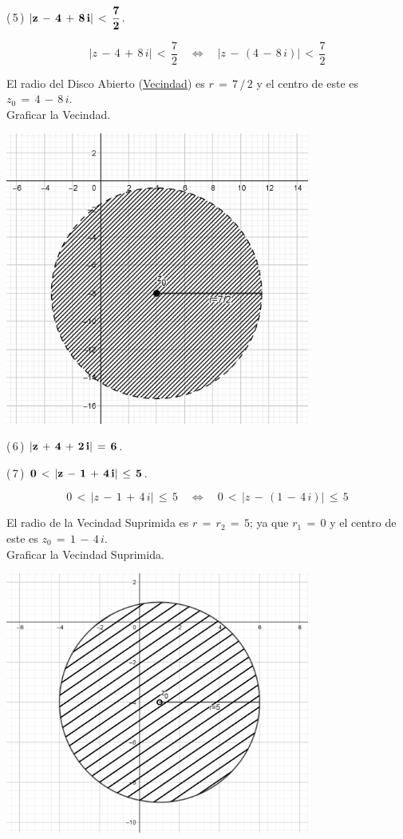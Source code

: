 \documentclass[a4paper,11pt,openany]{book}
\begin{document}
\textcolor{ao(english)}{(\,5\,)} $\bf{|z\,-\,4\,+\,8\,i|\,<\,\dfrac{7}{2}}$.

$$|z\,-\,4\,+\,8\,i|\,<\,\dfrac{7}{2} \quad\iff\quad |z\,-\,(4\,-\,8\,i)|\,<\,\dfrac{7}{2}$$

El radio del Disco Abierto (\underline{Vecindad}) es $r\,=\,7\,/\,2$ y el centro de este es $z_{0}\,=\,4\,-\,8\,i$.\\

\textcolor{ao(english)}{} Graficar la Vecindad.

\begin{center}
    \includegraphics[width=10cm]{Gra-Ej-5.png}
\end{center}

\textcolor{ao(english)}{(\,6\,)} $\bf{|z\,+\,4\,+\,2\,i|\,=\,6}$.

\textcolor{ao(english)}{(\,7\,)} $\bf{0\,<\,|z\,-\,1\,+\,4\,i|\,\leq\,5}$.

$$0\,<\,|z\,-\,1\,+\,4\,i|\,\leq\,5 \quad\iff\quad 0\,<\,|z\,-\,(1\,-\,4\,i)|\,\leq\,5$$

El radio de la Vecindad Suprimida es $r\,=\,r_{2}\,=\,5$; ya que $r_{1}\,=\,0$ y el centro de este es $z_{0}\,=\,1\,-\,4\,i$.\\

\textcolor{ao(english)}{} Graficar la Vecindad Suprimida.

\begin{center}
    \includegraphics[width=10cm]{Gra-Ej-7.png}
\end{center}
\end{document}
